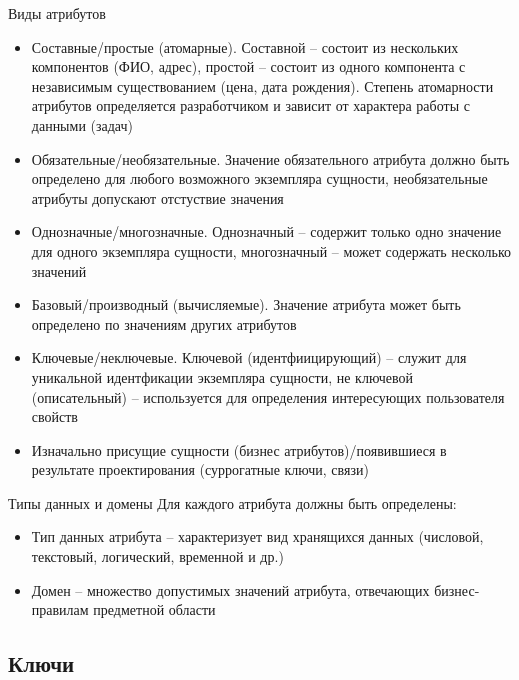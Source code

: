 \documentclass[12pt]{article}
\begin{document}
\begin{nota}{Виды атрибутов}
    \begin{itemize}
        \item Составные/простые (атомарные). Составной -- состоит из нескольких компонентов (ФИО, адрес), простой -- состоит из одного компонента с независимым существованием (цена, дата рождения). Степень атомарности атрибутов определяется разработчиком и зависит от характера работы с данными (задач)
        \item Обязательные/необязательные. Значение обязательного атрибута должно быть определено для любого возможного экземпляра сущности, необязательные атрибуты допускают отстуствие значения 
        \item Однозначные/многозначные. Однозначный -- содержит только одно значение для одного экземпляра сущности, многозначный -- может содержать несколько значений 
        \item Базовый/производный (вычисляемые). Значение атрибута может быть определено по значениям других атрибутов
        \item Ключевые/неключевые. Ключевой (идентфиицирующий) -- служит для уникальной идентфикации экземпляра сущности, не ключевой (описательный) -- используется для определения интересующих пользователя свойств 
        \item Изначально присущие сущности (бизнес атрибутов)/появившиеся в результате проектирования (суррогатные ключи, связи)
    \end{itemize}
\end{nota}

\begin{nota}{Типы данных и домены}
    Для каждого атрибута должны быть определены:

    \begin{itemize}
        \item Тип данных атрибута -- характеризует вид хранящихся данных (числовой, текстовый, логический, временной и др.)
        \item Домен -- множество допустимых значений атрибута, отвечающих бизнес-правилам предметной области 
    \end{itemize}
\end{nota}

\newpage

\subsection{Ключи}
\end{document}
